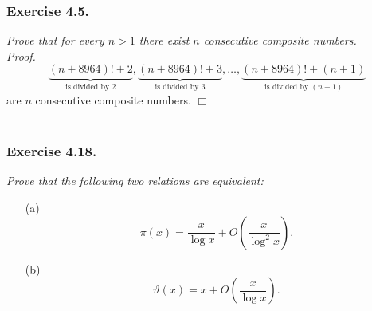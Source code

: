 \documentclass{article}
\begin{document}
\subsubsection*{Exercise 4.5.}
\emph{Prove that for every $n>1$ there exist $n$ consecutive composite numbers.} \\



\emph{Proof.}
  \[
    \underbrace{(n+8964)!+2}_{\text{is divided by $2$}},
    \underbrace{(n+8964)!+3}_{\text{is divided by $3$}}, \ldots,
    \underbrace{(n+8964)!+(n+1)}_{\text{is divided by $(n+1)$}}
  \]
  are $n$ consecutive composite numbers.
$\Box$ \\\\






\subsubsection*{Exercise 4.18.}
\emph{Prove that the following two relations are equivalent:}
\begin{enumerate}
\item[(a)]
  \[
    \pi(x) = \frac{x}{\log x} + O\left( \frac{x}{\log^2 x} \right).
  \]

\item[(b)]
  \[
    \vartheta(x) = x + O\left( \frac{x}{\log x} \right).
  \] \\
\end{enumerate}
\end{document}
